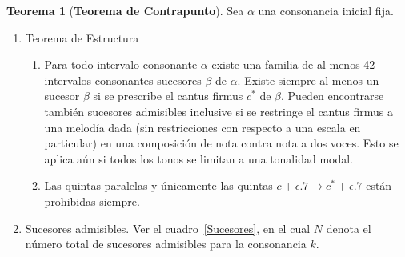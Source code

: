 \documentclass[letterpaper,12pt]{book}
\theoremstyle{definition} \newtheorem{Def}{Definición}[chapter]
\theoremstyle{definition} \newtheorem{Teo}{Teorema}[chapter]
\theoremstyle{definition} \newtheorem{Pro}{Proposición}[chapter]
\theoremstyle{definition} \newtheorem{Lema}{Lema}[chapter]
\begin{document}
\begin{Teo}[\textbf{Teorema de Contrapunto}]\label{TC}
Sea $\alpha$ una consonancia inicial fija.
\begin{enumerate}    
\item Teorema de Estructura
   \begin{enumerate}  
   \item  Para todo intervalo consonante $\alpha$ existe una familia de al menos 42 intervalos consonantes sucesores $\beta$ de $\alpha$. Existe siempre al menos un sucesor $\beta$ si se prescribe el cantus firmus $c^*$ de $\beta$. Pueden encontrarse también sucesores admisibles inclusive si se restringe el cantus firmus a una melodía dada (sin restricciones con respecto a una escala en particular) en una composición de nota contra nota a dos voces. Esto se aplica aún si todos los tonos se limitan a una tonalidad modal.    
   \item Las quintas paralelas y únicamente las quintas $c+\epsilon.$$7$$\to c^*+ \epsilon.$$7$ están prohibidas siempre.
   \end{enumerate}    
\item Sucesores admisibles. Ver el cuadro~\ref{Sucesores}, en el cual $N$ denota el número total de sucesores admisibles para la consonancia $k$.


\end{enumerate}
\end{Teo}
\end{document}
